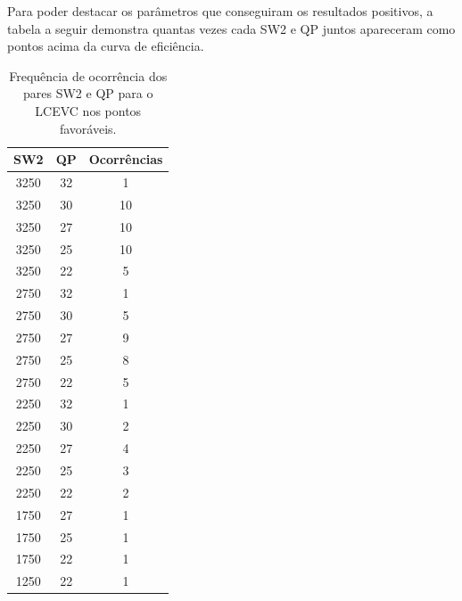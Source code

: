Para poder destacar os parâmetros que conseguiram os resultados positivos, a tabela a seguir demonstra
quantas vezes cada SW2 e QP juntos apareceram como pontos acima da curva de eficiência.

\begin{table}[h]
    \centering
    \begin{tabular}{|c|c|c|}
        \hline
        \textbf{SW2} & \textbf{QP} & \textbf{Ocorrências} \\
        \hline
        3250 & 32 & 1 \\
        3250 & 30 & 10 \\
        3250 & 27 & 10 \\
        3250 & 25 & 10 \\
        3250 & 22 & 5 \\
        \hline
        2750 & 32 & 1 \\
        2750 & 30 & 5 \\
        2750 & 27 & 9 \\
        2750 & 25 & 8 \\
        2750 & 22 & 5 \\
        \hline
        2250 & 32 & 1 \\
        2250 & 30 & 2 \\
        2250 & 27 & 4 \\
        2250 & 25 & 3 \\
        2250 & 22 & 2 \\
        \hline
        1750 & 27 & 1 \\
        1750 & 25 & 1 \\
        1750 & 22 & 1 \\
        \hline
        1250 & 22 & 1 \\
        \hline
    \end{tabular}
    \caption{Frequência de ocorrência dos pares SW2 e QP para o \acrshort{LCEVC} nos pontos favoráveis.}
    \label{tab:sw2_qp_freq}
\end{table}